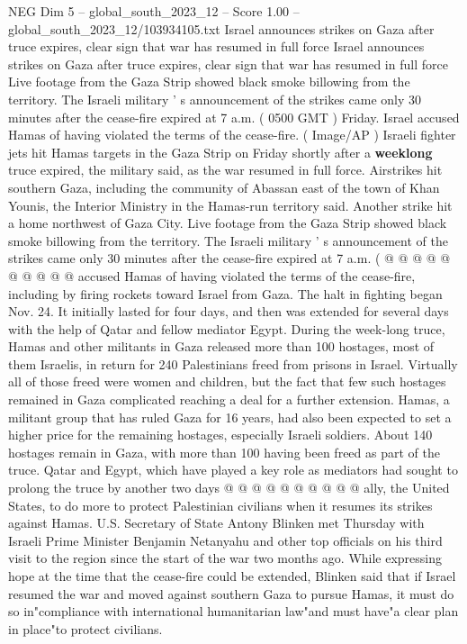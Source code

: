 \begin{textsample}{NEG Dim 5 – global\_south\_2023\_12 – Score 1.00 – global\_south\_2023\_12/103934105.txt}  \label{ex:f5_neg_233}
Israel announces strikes on Gaza after truce expires, clear sign that war has resumed in full force Israel announces strikes on Gaza after truce expires, clear sign that war has resumed in full force Live footage from the Gaza Strip showed black smoke billowing from the territory.
The Israeli military ' s announcement of the strikes came only 30 minutes after the cease-fire expired at 7 a.m. ( 0500 GMT ) Friday.
Israel accused Hamas of having violated the terms of the cease-fire. ( Image/AP ) Israeli fighter jets hit Hamas targets in the Gaza Strip on Friday shortly after a \textbf{weeklong} truce expired, the military said, as the war resumed in full force.
Airstrikes hit southern Gaza, including the community of Abassan east of the town of Khan Younis, the Interior Ministry in the Hamas-run territory said.
Another strike hit a home northwest of Gaza City.
Live footage from the Gaza Strip showed black smoke billowing from the territory.
The Israeli military ' s announcement of the strikes came only 30 minutes after the cease-fire expired at 7 a.m. ( @ @ @ @ @ @ @ @ @ @ accused Hamas of having violated the terms of the cease-fire, including by firing rockets toward Israel from Gaza.
The halt in fighting began Nov. 24.
It initially lasted for four days, and then was extended for several days with the help of Qatar and fellow mediator Egypt.
During the week-long truce, Hamas and other militants in Gaza released more than 100 hostages, most of them Israelis, in return for 240 Palestinians freed from prisons in Israel.
Virtually all of those freed were women and children, but the fact that few such hostages remained in Gaza complicated reaching a deal for a further extension.
Hamas, a militant group that has ruled Gaza for 16 years, had also been expected to set a higher price for the remaining hostages, especially Israeli soldiers.
About 140 hostages remain in Gaza, with more than 100 having been freed as part of the truce.
Qatar and Egypt, which have played a key role as mediators had sought to prolong the truce by another two days @ @ @ @ @ @ @ @ @ @ ally, the United States, to do more to protect Palestinian civilians when it resumes its strikes against Hamas.
U.S.
Secretary of State Antony Blinken met Thursday with Israeli Prime Minister Benjamin Netanyahu and other top officials on his third visit to the region since the start of the war two months ago.
While expressing hope at the time that the cease-fire could be extended, Blinken said that if Israel resumed the war and moved against southern Gaza to pursue Hamas, it must do so in"compliance with international humanitarian law"and must have"a clear plan in place"to protect civilians.

\end{textsample}
